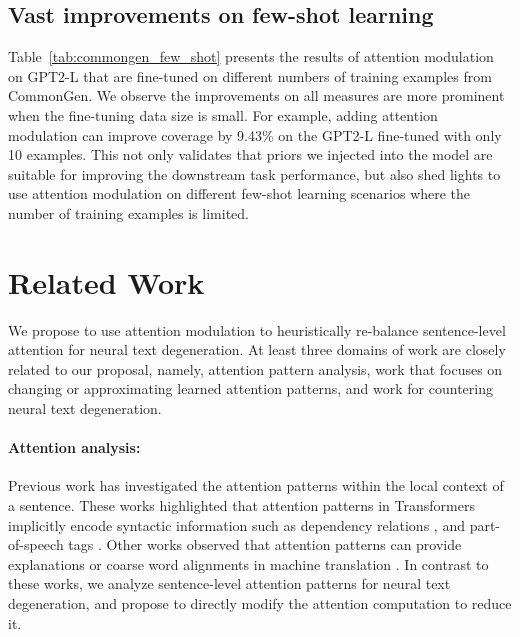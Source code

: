 \documentclass[11pt,a4paper]{article}
\newcommand{\alg}{attention modulation}
\begin{document}
\subsection{Vast improvements on few-shot learning}
Table~\ref{tab:commongen_few_shot} presents the results of \alg{} on GPT2-L  that are fine-tuned on different numbers of training examples from CommonGen. We observe the improvements on all measures are more prominent when the fine-tuning data size is small. For example, adding \alg{} can improve coverage by 9.43\%  on the GPT2-L fine-tuned with only 10 examples.
This not only validates that priors we injected into the model are suitable for improving the downstream task performance, but also shed lights to use \alg{} on different few-shot learning scenarios where the number of training examples is limited. 


\section{Related Work}
We propose to use attention modulation to heuristically  re-balance sentence-level attention for neural text degeneration.  At least three domains of work are closely related to our proposal, namely, attention pattern analysis, work that focuses on changing or approximating learned attention patterns, and work for countering neural text degeneration. 

\paragraph{Attention analysis:} 
Previous work has investigated the attention patterns within the local context of a sentence. These works highlighted that attention patterns in Transformers implicitly encode syntactic information such as dependency relations \citep{htut2019attention}, and part-of-speech tags \citep{vig-belinkov-2019-analyzing,raganato-tiedemann-2018-analysis}. Other works observed that attention patterns can provide explanations \citep{wiegreffe2019attention} or coarse word alignments in machine translation \citep{zenkel2019adding,kobayashi-etal-2020-attention}. %
In contrast to these works, we analyze sentence-level attention patterns for neural text degeneration, and propose to directly modify the attention computation to reduce it.  
\end{document}

